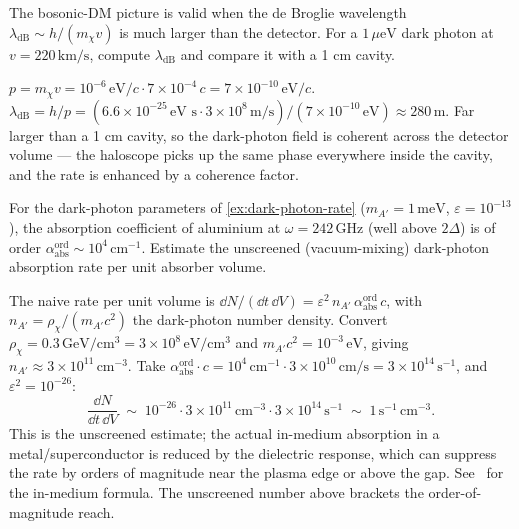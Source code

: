 \begin{exercise}
The bosonic-DM picture is valid when the de Broglie wavelength
$\lambda_\text{dB}\sim h/(m_\chi v)$ is much larger than the
detector. For a $1\,\mu\text{eV}$ dark photon at $v=220\,\text{km}/\text{s}$,
compute $\lambda_\text{dB}$ and compare it with a 1 cm cavity.
\begin{solution}
$p=m_\chi v=10^{-6}\,\text{eV}/c\cdot 7\times 10^{-4}\,c=7\times 10^{-10}\,\text{eV}/c$.
$\lambda_\text{dB}=h/p=(6.6\times 10^{-25}\,\text{eV s}\cdot
3\times 10^8\,\text{m/s})/(7\times 10^{-10}\,\text{eV})\approx 280\,\text{m}$.
Far larger than a 1 cm cavity, so the dark-photon field is coherent
across the detector volume --- the haloscope picks up the same
phase everywhere inside the cavity, and the rate is enhanced by a
coherence factor.
\end{solution}
\end{exercise}

\begin{exercise}
For the dark-photon parameters of \cref{ex:dark-photon-rate}
($m_{A'}=1\,\text{meV}$, $\varepsilon=10^{-13}$), the
absorption coefficient of aluminium at $\omega=242\,\text{GHz}$
(well above $2\Delta$) is of order
$\alpha_\text{abs}^\text{ord}\sim 10^4\,\text{cm}^{-1}$. Estimate
the unscreened (vacuum-mixing) dark-photon absorption rate per
unit absorber volume.
\begin{solution}
The naive rate per unit volume is
$\dd N/(\dd t\,\dd V)=\varepsilon^2\,n_{A'}\,\alpha_\text{abs}^\text{ord}\,c$,
with $n_{A'}=\rho_\chi/(m_{A'}c^2)$ the dark-photon number
density. Convert
$\rho_\chi=0.3\,\text{GeV}/\text{cm}^3 = 3\times 10^{8}\,\text{eV}/\text{cm}^3$
and $m_{A'}c^2=10^{-3}\,\text{eV}$, giving
$n_{A'}\approx 3\times 10^{11}\,\text{cm}^{-3}$. Take
$\alpha_\text{abs}^\text{ord}\cdot c=10^4\,\text{cm}^{-1}\cdot 3\times 10^{10}\,\text{cm/s}
=3\times 10^{14}\,\text{s}^{-1}$, and $\varepsilon^2=10^{-26}$:
\[
\frac{\dd N}{\dd t\,\dd V}
\;\sim\; 10^{-26}\cdot 3\times 10^{11}\,\text{cm}^{-3}\cdot 3\times 10^{14}\,\text{s}^{-1}
\;\sim\; 1\,\text{s}^{-1}\,\text{cm}^{-3}.
\]
This is the unscreened estimate; the actual in-medium absorption
in a metal/superconductor is reduced by the dielectric response,
which can suppress the rate by orders of magnitude near the
plasma edge or above the gap. See~\cite{caputo2021review} for the
in-medium formula. The unscreened number above brackets the
order-of-magnitude reach.
\end{solution}
\end{exercise}

